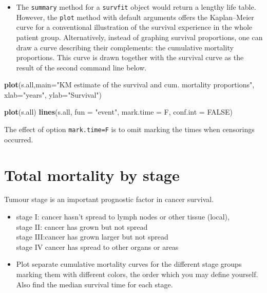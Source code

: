 \documentclass[
]{book}
\newenvironment{Shaded}{\begin{snugshade}}{\end{snugshade}}
\newcommand{\AttributeTok}[1]{\textcolor[rgb]{0.13,0.29,0.53}{#1}}
\newcommand{\ConstantTok}[1]{\textcolor[rgb]{0.56,0.35,0.01}{#1}}
\newcommand{\FunctionTok}[1]{\textcolor[rgb]{0.13,0.29,0.53}{\textbf{#1}}}
\newcommand{\NormalTok}[1]{#1}
\newcommand{\StringTok}[1]{\textcolor[rgb]{0.31,0.60,0.02}{#1}}
\providecommand{\tightlist}{%
  \setlength{\itemsep}{0pt}\setlength{\parskip}{0pt}}
\begin{document}
\begin{itemize}
\tightlist
\item
  The \texttt{summary} method for
  a \texttt{survfit} object would return a lengthy life table.
  However, the \texttt{plot} method with default
  arguments offers the Kaplan--Meier curve
  for a conventional illustration of the survival experience in the whole patient group.
  Alternatively, instead of graphing survival proportions,
  one can draw a curve describing their complements: the cumulative mortality proportions. This curve is drawn together with the survival curve as the
  result of the second command line below.
\end{itemize}

\begin{Shaded}
\begin{Highlighting}[]
\FunctionTok{plot}\NormalTok{(s.all,}\AttributeTok{main=}\StringTok{"KM estimate of the survival}
\StringTok{     and cum. mortality proportions"}\NormalTok{,}
     \AttributeTok{xlab=}\StringTok{"years"}\NormalTok{, }\AttributeTok{ylab=}\StringTok{"Survival"}\NormalTok{)}
\end{Highlighting}
\end{Shaded}

\begin{Shaded}
\begin{Highlighting}[]
\FunctionTok{plot}\NormalTok{(s.all)}
\FunctionTok{lines}\NormalTok{(s.all, }\AttributeTok{fun =} \StringTok{"event"}\NormalTok{, }\AttributeTok{mark.time =}\NormalTok{ F, }\AttributeTok{conf.int =} \ConstantTok{FALSE}\NormalTok{)}
\end{Highlighting}
\end{Shaded}

The effect of option \texttt{mark.time=F} is to omit
marking the times when censorings occurred.

\section{Total mortality by stage}\label{total-mortality-by-stage}

Tumour stage is an important prognostic factor in cancer survival.

\begin{itemize}
\item
  stage I: cancer hasn't spread to lymph nodes or other tissue (local),\\
  stage II: cancer has grown but not spread\\
  stage III:cancer has grown larger but not spread\\
  stage IV cancer has spread to other organs or areas
\item
  Plot separate cumulative mortality curves for the different stage groups
  marking them with different colors, the order which you may define yourself.
  Also find the median survival time for each stage.
\end{itemize}
\end{document}
